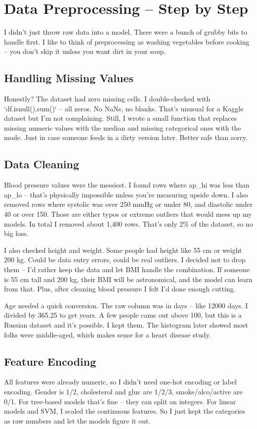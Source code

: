 \documentclass[12pt, a4paper, oneside]{book}
\begin{document}
\section{Data Preprocessing -- Step by Step}
I didn't just throw raw data into a model. There were a bunch of grubby bits to handle first. I like to think of preprocessing as washing vegetables before cooking -- you don't skip it unless you want dirt in your soup.

\subsection{Handling Missing Values}
Honestly? The dataset had zero missing cells. I double-checked with `df.isnull().sum()` -- all zeros. No NaNs, no blanks. That's unusual for a Kaggle dataset but I'm not complaining. Still, I wrote a small function that replaces missing numeric values with the median and missing categorical ones with the mode. Just in case someone feeds in a dirty version later. Better safe than sorry.

\subsection{Data Cleaning}
Blood pressure values were the messiest. I found rows where ap\_hi was less than ap\_lo -- that's physically impossible unless you're measuring upside down. I also removed rows where systolic was over 250 mmHg or under 80, and diastolic under 40 or over 150. Those are either typos or extreme outliers that would mess up my models. In total I removed about 1,400 rows. That's only 2\% of the dataset, so no big loss.

I also checked height and weight. Some people had height like 55 cm or weight 200 kg. Could be data entry errors, could be real outliers. I decided not to drop them -- I'd rather keep the data and let BMI handle the combination. If someone is 55 cm tall and 200 kg, their BMI will be astronomical, and the model can learn from that. Plus, after cleaning blood pressure I felt I'd done enough cutting.

Age needed a quick conversion. The raw column was in days -- like 12000 days. I divided by 365.25 to get years. A few people came out above 100, but this is a Russian dataset and it's possible. I kept them. The histogram later showed most folks were middle-aged, which makes sense for a heart disease study.

\subsection{Feature Encoding}
All features were already numeric, so I didn't need one-hot encoding or label encoding. Gender is 1/2, cholesterol and gluc are 1/2/3, smoke/alco/active are 0/1. For tree-based models that's fine -- they can split on integers. For linear models and SVM, I scaled the continuous features. So I just kept the categories as raw numbers and let the models figure it out.
\end{document}
